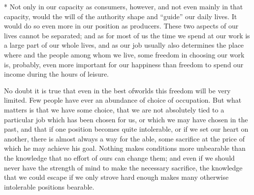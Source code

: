 \documentclass[11pt,openany]{book}
\begin{document}
\begin{center}\textasteriskcentered\hspace{0.9em}\textasteriskcentered\hspace{0.9em}\textasteriskcentered\end{center}

\begin{center}\textasteriskcentered\hspace{0.9em}\textasteriskcentered\hspace{0.9em}\textasteriskcentered\end{center}

* Not only in our capacity as consumers, however, and not even mainly in that capacity, would the will of the authority shape and ``guide'' our daily lives. It would do so even more in our position as producers. These two aspects of our lives cannot be separated; and as for most of us the time we spend at our work is a large part of our whole lives, and as our job usually also determines the place where and the people among whom we live, some freedom in choosing our work is, probably, even more important for our happiness than freedom to spend our income during the hours of leisure.

No doubt it is true that even in the best ofworlds this freedom will be very limited. Few people have ever an abundance of choice of occupation. But what matters is that we have some choice, that we are not absolutely tied to a particular job which has been chosen for us, or which we may have chosen in the past, and that if one position becomes quite intolerable, or if we set our heart on another, there is almost always a way for the able, some sacrifice at the price of which he may achieve his goal. Nothing makes conditions more unbearable than the knowledge that no effort of ours can change them; and even if we should never have the strength of mind to make the necessary sacrifice, the knowledge that we could escape if we only strove hard enough makes many otherwise intolerable positions bearable.
\end{document}
